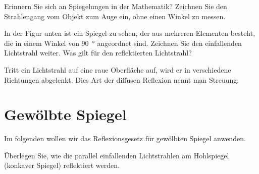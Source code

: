 \documentclass[12pt,a4paper,twoside]{article}
\begin{document}
\newpage

\begin{aufgabe}
Erinnern Sie sich an Spiegelungen in der Mathematik? Zeichnen Sie den Strahlengang vom Objekt zum Auge ein, ohne einen Winkel zu messen.\\	
\end{aufgabe}

\begin{aufgabe}
	In der Figur unten ist ein Spiegel zu sehen, der aus mehreren Elementen besteht, die in einem Winkel von \SI{90}{\degree}
	angeordnet sind. Zeichnen Sie den einfallenden Lichtstrahl weiter. Was gilt für den reflektierten Lichtstrahl?


\end{aufgabe}


Tritt ein Lichtstrahl auf eine raue Oberfläche auf, wird er in verschiedene Richtungen abgelenkt. Dies Art der diffusen Reflexion
nennt man Streuung.


\newpage

\section{Gewölbte Spiegel}
Im folgenden wollen wir das Reflexionsgesetz für gewölbten Spiegel anwenden. 
\begin{aufgabe}
Überlegen Sie, wie die parallel einfallenden
Lichtstrahlen am Hohlspiegel (konkaver Spiegel) reflektiert werden.

\begin{center}
\end{center}
\end{aufgabe}
\end{document}
